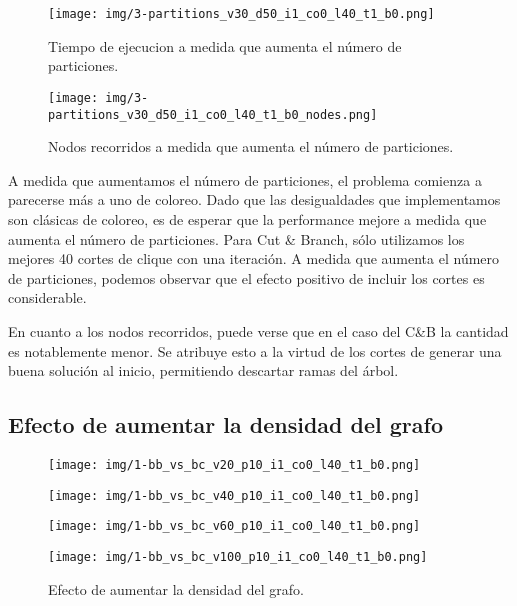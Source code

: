 \begin{figure}[h]
  \centering
  \begin{minipage}[b]{0.49\textwidth}
    \texttt{[image: img/3-partitions\_v30\_d50\_i1\_co0\_l40\_t1\_b0.png]}
    \caption{Tiempo de ejecucion a medida que aumenta el número de particiones.}
  \end{minipage}
  \hfill
  \begin{minipage}[b]{0.49\textwidth}
    \texttt{[image: img/3-partitions\_v30\_d50\_i1\_co0\_l40\_t1\_b0\_nodes.png]}
    \caption{Nodos recorridos a medida que aumenta el número de particiones.}
  \end{minipage}
\end{figure}

A medida que aumentamos el número de particiones, el problema comienza a parecerse más a uno de coloreo. Dado que las desigualdades que implementamos son clásicas de coloreo, es de esperar que la performance mejore a medida que aumenta el número de particiones. Para Cut \& Branch, sólo utilizamos los mejores 40 cortes de clique con una iteración. A medida que aumenta el número de particiones, podemos observar que el efecto positivo de incluir los cortes es considerable.

En cuanto a los nodos recorridos, puede verse que en el caso del C\&B la cantidad es notablemente menor. Se atribuye esto a la virtud de los cortes de generar una buena solución al inicio, permitiendo descartar ramas del árbol.

\subsection{Efecto de aumentar la densidad del grafo}

\begin{figure}[h]
  \centering
  \begin{minipage}[b]{0.49\textwidth}
    \texttt{[image: img/1-bb\_vs\_bc\_v20\_p10\_i1\_co0\_l40\_t1\_b0.png]}
  \end{minipage}
  \hfill
  \begin{minipage}[b]{0.49\textwidth}
    \texttt{[image: img/1-bb\_vs\_bc\_v40\_p10\_i1\_co0\_l40\_t1\_b0.png]}
  \end{minipage}
  \begin{minipage}[b]{0.49\textwidth}
    \texttt{[image: img/1-bb\_vs\_bc\_v60\_p10\_i1\_co0\_l40\_t1\_b0.png]}
  \end{minipage}
  \hfill
  \begin{minipage}[b]{0.49\textwidth}
    \texttt{[image: img/1-bb\_vs\_bc\_v100\_p10\_i1\_co0\_l40\_t1\_b0.png]}
  \end{minipage}
	\caption{Efecto de aumentar la densidad del grafo.}
\end{figure}

